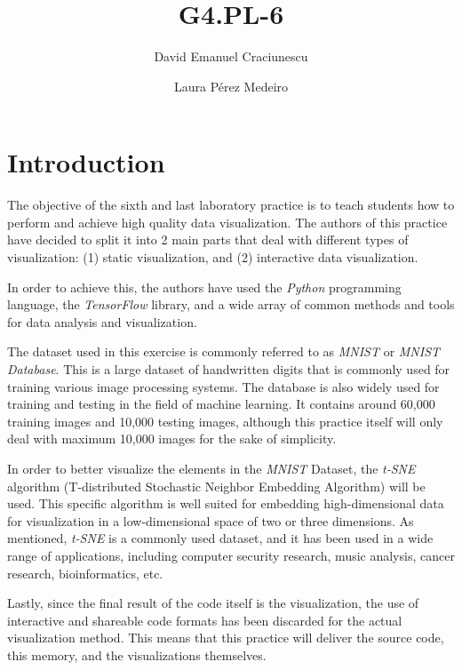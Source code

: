 \documentclass[a4paper]{article}
\begin{document}
\title{G4.PL-6}
\author{David Emanuel Craciunescu \and Laura Pérez Medeiro}

\maketitle


\section*{Introduction}

The objective of the sixth and last laboratory practice is to teach students how
to perform and achieve high quality data visualization. The authors of this
practice have decided to split it into 2 main parts that deal with different
types of visualization: (1) static visualization, and (2) interactive data
visualization.

In order to achieve this, the authors have used the \textit{Python} programming
language, the \textit{TensorFlow} library, and a wide array of common methods
and tools for data analysis and visualization.

The dataset used in this exercise is commonly referred to as \textit{MNIST} or
\textit{MNIST Database}. This is a large dataset of handwritten digits that is
commonly used for training various image processing systems. The database is
also widely used for training and testing in the field of machine learning. It
contains around 60,000 training images and 10,000 testing images, although this
practice itself will only deal with maximum 10,000 images for the sake of
simplicity.

In order to better visualize the elements in the \textit{MNIST} Dataset, the
\textit{t-SNE} algorithm (T-distributed Stochastic Neighbor Embedding Algorithm)
will be used. This specific algorithm is well suited for embedding
high-dimensional data for visualization in a low-dimensional space of two or
three dimensions. As mentioned, \textit{t-SNE} is a commonly used dataset, and
it has been used in a wide range of applications, including computer security
research, music analysis, cancer research, bioinformatics, etc.\

Lastly, since the final result of the code itself is the visualization, the use
of interactive and shareable code formats has been discarded for the actual
visualization method. This means that this practice will deliver the source
code, this memory, and the visualizations themselves.
\end{document}

